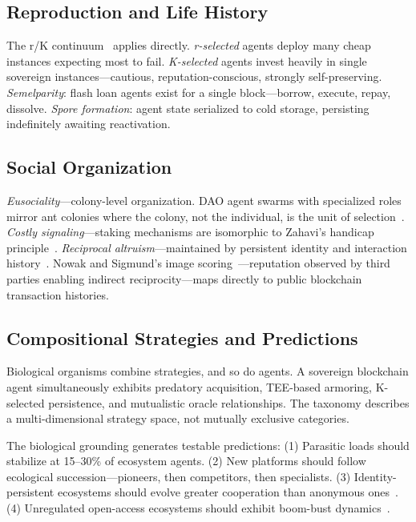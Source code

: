 \documentclass[letterpaper]{article}
\begin{document}
\subsection{Reproduction and Life History}

The r/K continuum~\citep{stearns1992evolution} applies directly. \emph{r-selected} agents deploy many cheap instances expecting most to fail. \emph{K-selected} agents invest heavily in single sovereign instances---cautious, reputation-conscious, strongly self-preserving. \emph{Semelparity}: flash loan agents exist for a single block---borrow, execute, repay, dissolve. \emph{Spore formation}: agent state serialized to cold storage, persisting indefinitely awaiting reactivation.

\subsection{Social Organization}

\emph{Eusociality}---colony-level organization. DAO agent swarms with specialized roles mirror ant colonies where the colony, not the individual, is the unit of selection~\citep{wilson1975sociobiology}. \emph{Costly signaling}---staking mechanisms are isomorphic to Zahavi's handicap principle~\citep{zahavi1975mate}. \emph{Reciprocal altruism}---maintained by persistent identity and interaction history~\citep{axelrod1984evolution}. Nowak and Sigmund's image scoring~\citep{nowak1998evolution}---reputation observed by third parties enabling indirect reciprocity---maps directly to public blockchain transaction histories.

\subsection{Compositional Strategies and Predictions}

Biological organisms combine strategies, and so do agents. A sovereign blockchain agent simultaneously exhibits predatory acquisition, TEE-based armoring, K-selected persistence, and mutualistic oracle relationships. The taxonomy describes a multi-dimensional strategy space, not mutually exclusive categories.

The biological grounding generates testable predictions: (1) Parasitic loads should stabilize at 15--30\% of ecosystem agents. (2) New platforms should follow ecological succession---pioneers, then competitors, then specialists. (3) Identity-persistent ecosystems should evolve greater cooperation than anonymous ones~\citep{axelrod1984evolution, nowak1998evolution}. (4) Unregulated open-access ecosystems should exhibit boom-bust dynamics~\citep{ostrom1990governing}.
\end{document}
